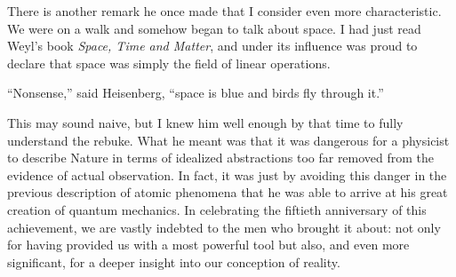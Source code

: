 \documentclass[12pt]{article}
\begin{document}
There is another remark he once made that I consider even more characteristic. We were on a walk and somehow began to talk about space. I had just read Weyl's book {\it Space, Time and Matter}, and under its influence was proud to declare that space was simply the field of linear operations.

``Nonsense,'' said Heisenberg, ``space is blue and birds fly through it.''

This may sound naive, but I knew him well enough by that time to fully understand the rebuke. What he meant was that it was dangerous for a physicist to describe Nature in terms of idealized abstractions too far removed from the evidence of actual observation. In fact, it was just by avoiding this danger in the previous description of atomic phenomena that he was able to arrive at his great creation of quantum mechanics. In celebrating the fiftieth anniversary of this achievement, we are vastly indebted to the men who brought it about: not only for having provided us with a most powerful tool but also, and even more significant, for a deeper insight into our conception of reality.

\end{document}

